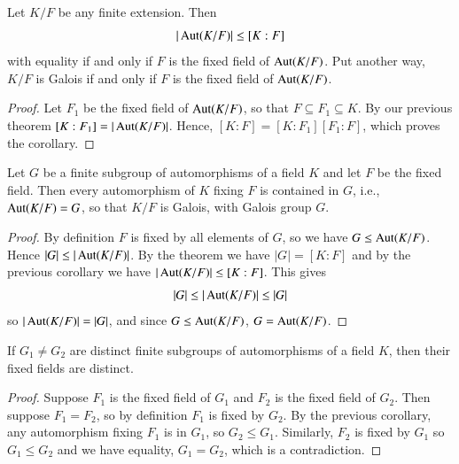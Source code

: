 \documentclass[12pt, a4paper, oneside, openright, titlepage]{book}
\begin{document}
\begin{cor}\label{cor:galifffixed}
    Let $K/F$ be any finite extension. Then \begin{equation*}
        |\operatorname{Aut}(K/F)| \leq [K:F]
    \end{equation*}
    with equality if and only if $F$ is the fixed field of $\operatorname{Aut}(K/F)$. Put another way, $K/F$ is Galois if and only if $F$ is the fixed field of $\operatorname{Aut}(K/F)$.
\end{cor}
\begin{proof}
    Let $F_1$ be the fixed field of $\operatorname{Aut}(K/F)$, so that $F \subseteq F_1 \subseteq K$. By our previous theorem $[K:F_1] = |\operatorname{Aut}(K/F)|$. Hence, $[K:F] = [K:F_1][F_1:F]$, which proves the corollary.
\end{proof}


\begin{cor}\label{cor:subaut}
    Let $G$ be a finite subgroup of automorphisms of a field $K$ and let $F$ be the fixed field. Then every automorphism of $K$ fixing $F$ is contained in $G$, i.e., $\operatorname{Aut}(K/F) = G$, so that $K/F$ is Galois, with Galois group $G$.
\end{cor}
\begin{proof}
    By definition $F$ is fixed by all elements of $G$, so we have $G \leq \operatorname{Aut}(K/F)$. Hence $|G| \leq |\operatorname{Aut}(K/F)|$. By the theorem we have $|G| = [K:F]$ and by the previous corollary we have $|\operatorname{Aut}(K/F)| \leq [K:F]$. This gives \begin{equation*}
        |G| \leq |\operatorname{Aut}(K/F)| \leq |G|
    \end{equation*}
    so $|\operatorname{Aut}(K/F)| = |G|$, and since $G \leq \operatorname{Aut}(K/F)$, $G = \operatorname{Aut}(K/F)$. 
\end{proof}

\begin{cor}\label{cor:distffs}
    If $G_1\neq G_2$ are distinct finite subgroups of automorphisms of a field $K$, then their fixed fields are distinct.
\end{cor}
\begin{proof}
    Suppose $F_1$ is the fixed field of $G_1$ and $F_2$ is the fixed field of $G_2$. Then suppose $F_1 = F_2$, so by definition $F_1$ is fixed by $G_2$. By the previous corollary, any automorphism fixing $F_1$ is in $G_1$, so $G_2 \leq G_1$. Similarly, $F_2$ is fixed by $G_1$ so $G_1 \leq G_2$ and we have equality, $G_1 = G_2$, which is a contradiction.
\end{proof}
\end{document}

